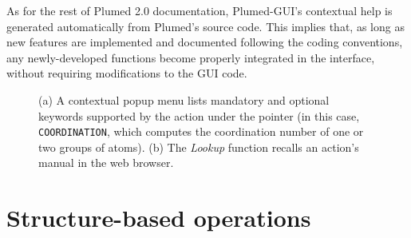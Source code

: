 \documentclass[preprint,review,11pt]{elsarticle}
\begin{document}
As for the rest of Plumed 2.0 documentation, Plumed-GUI's contextual
help is generated automatically from Plumed's source code.  This
implies that, as long as new features are implemented and documented
following the coding conventions, any newly-developed functions become
properly integrated in the interface, without requiring modifications
to the GUI code.






\begin{figure}
  \centering
  \caption{(a) A contextual popup menu lists mandatory and
    optional keywords supported by the action under the pointer (in
    this case, \texttt{COORDINATION}, which computes the coordination
    number of one or two groups of atoms). (b) The \emph{Lookup} function
    recalls an action's manual in the web browser. }
  \label{fig:help}
\end{figure}





\section{Structure-based operations}
\end{document}
